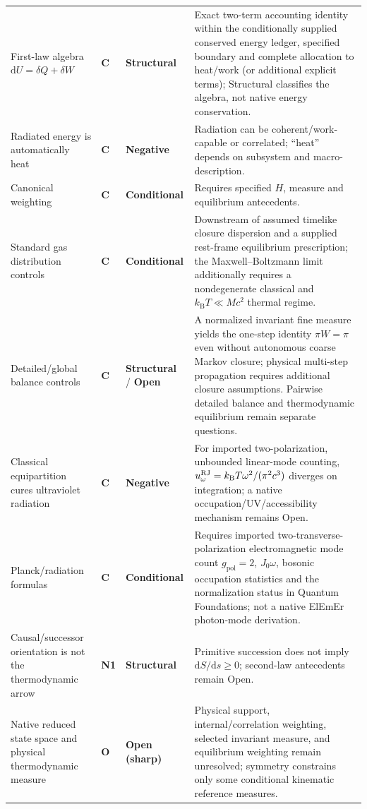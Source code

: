 \documentclass[11pt]{article}
\theoremstyle{definition}
\newcommand{\dd}{\mathrm{d}}
\newcommand{\kb}{k_{\mathrm B}}
\newcommand{\statusStructural}{\textcolor{blue!55!black}{\textbf{Structural}}}
\newcommand{\statusConditional}{\textcolor{yellow!60!black}{\textbf{Conditional}}}
\newcommand{\statusOpen}{\textcolor{red!75!black}{\textbf{Open}}}
\newcommand{\statusNegative}{\textcolor{red!65!black}{\textbf{Negative}}}
\newcommand{\natNOne}{\textcolor{blue!70!black}{\textbf{N1}}}
\newcommand{\natControl}{\textcolor{gray!75!black}{\textbf{C}}}
\newcommand{\natOpen}{\textcolor{red!70!black}{\textbf{O}}}
\newcommand{\statusSharpOpen}{\textcolor{red!35!black}{\textbf{Open (sharp)}}}
\begin{document}
\begin{center}
\begin{longtable}{@{}P{3.5cm}P{1.7cm}P{2.5cm}P{5.6cm}@{}}
First-law algebra $\dd U=\delta Q+\delta W$
& \natControl{} & \statusStructural{}
& Exact two-term accounting identity within the conditionally supplied conserved energy ledger, specified boundary and complete allocation to heat/work (or additional explicit terms); Structural classifies the algebra, not native energy conservation. \\
Radiated energy is automatically heat
& \natControl{} & \statusNegative{}
& Radiation can be coherent/work-capable or correlated; ``heat'' depends on subsystem and macro-description. \\
Canonical weighting
& \natControl{} & \statusConditional{}
& Requires specified $H$, measure and equilibrium antecedents. \\
Standard gas distribution controls
& \natControl{} & \statusConditional{}
& Downstream of assumed timelike closure dispersion and a supplied rest-frame equilibrium prescription; the Maxwell--Boltzmann limit additionally requires a nondegenerate classical and $\kb T\ll Mc^2$ thermal regime. \\
Detailed/global balance controls
& \natControl{} & \statusStructural{} / \statusOpen{}
& A normalized invariant fine measure yields the one-step identity $\pi W=\pi$ even without autonomous coarse Markov closure; physical multi-step propagation requires additional closure assumptions.  Pairwise detailed balance and thermodynamic equilibrium remain separate questions. \\
Classical equipartition cures ultraviolet radiation
& \natControl{} & \statusNegative{}
& For imported two-polarization, unbounded linear-mode counting, $u_\omega^{\rm RJ}=\kb T\omega^2/(\pi^2c^3)$ diverges on integration; a native occupation/UV/accessibility mechanism remains Open. \\
Planck/radiation formulas
& \natControl{} & \statusConditional{}
& Requires imported two-transverse-polarization electromagnetic mode count $g_{\mathrm{pol}}=2$, $J_0\omega$, bosonic occupation statistics and the normalization status in Quantum Foundations; not a native ElEmEr photon-mode derivation. \\
Causal/successor orientation is not the thermodynamic arrow
& \natNOne{} & \statusStructural{}
& Primitive succession does not imply $\dd S/\dd s\ge0$; second-law antecedents remain Open. \\
Native reduced state space and physical thermodynamic measure
& \natOpen{} & \statusSharpOpen{}
& Physical support, internal/correlation weighting, selected invariant measure, and equilibrium weighting remain unresolved; symmetry constrains only some conditional kinematic reference measures. \\

\end{longtable}
\end{center}
\end{document}
